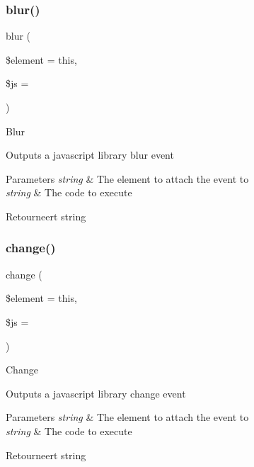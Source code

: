 \subsubsection{\texorpdfstring{blur()}{blur()}}
{\footnotesize\ttfamily blur (\begin{DoxyParamCaption}\item[{}]{\$element = {\ttfamily \textquotesingle{}this\textquotesingle{}},  }\item[{}]{\$js = {\ttfamily \textquotesingle{}\textquotesingle{}} }\end{DoxyParamCaption})}

Blur

Outputs a javascript library blur event


\begin{DoxyParams}{Parameters}
{\em string} & The element to attach the event to \\
\hline
{\em string} & The code to execute \\
\hline
\end{DoxyParams}
\begin{DoxyReturn}{Retourneert}
string 
\end{DoxyReturn}
\mbox{\label{class_c_i___javascript_a65a4442663cf513c7f18abfc6f0955aa}} 
\subsubsection{\texorpdfstring{change()}{change()}}
{\footnotesize\ttfamily change (\begin{DoxyParamCaption}\item[{}]{\$element = {\ttfamily \textquotesingle{}this\textquotesingle{}},  }\item[{}]{\$js = {\ttfamily \textquotesingle{}\textquotesingle{}} }\end{DoxyParamCaption})}

Change

Outputs a javascript library change event


\begin{DoxyParams}{Parameters}
{\em string} & The element to attach the event to \\
\hline
{\em string} & The code to execute \\
\hline
\end{DoxyParams}
\begin{DoxyReturn}{Retourneert}
string 
\end{DoxyReturn}
\mbox{\label{class_c_i___javascript_a4e3a7e7ffc20e8f578a0d66f52def10d}} 

